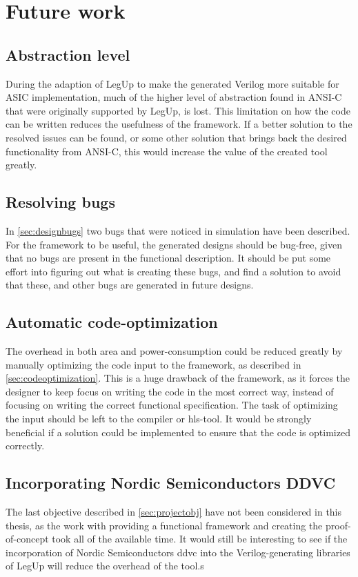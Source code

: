 \section{Future work}
\label{sec:futurework} 
\subsection{Abstraction level}
During the adaption of LegUp to make the generated Verilog more suitable for ASIC implementation, much of the higher level of abstraction found in ANSI-C that were originally supported by LegUp, is lost. This limitation on how the code can be written reduces the usefulness of the framework. If a better solution to the resolved issues can be found, or some other solution that brings back the desired functionality from ANSI-C, this would increase the value of the created tool greatly.

\subsection{Resolving bugs}
In \cref{sec:designbugs} two bugs that were noticed in simulation have been described. For the framework to be useful, the generated designs should be bug-free, given that no bugs are present in the functional description. It should be put some effort into figuring out what is creating these bugs, and find a solution to avoid that these, and other bugs are generated in future designs.

\subsection{Automatic code-optimization}
The overhead in both area and power-consumption could be reduced greatly by manually optimizing the code input to the framework, as described in \cref{sec:codeoptimization}. This is a huge drawback of the framework, as it forces the designer to keep focus on writing the code in the most correct way, instead of focusing on writing the correct functional specification. The task of optimizing the input should be left to the compiler or \gls{hls}-tool. It would be strongly beneficial if a solution could be implemented to ensure that the code is optimized correctly.

\subsection{Incorporating Nordic Semiconductors DDVC}
The last objective described in \cref{sec:projectobj} have not been considered in this thesis, as the work with providing a functional framework and creating the proof-of-concept took all of the available time. It would still be interesting to see if the incorporation of Nordic Semiconductors \gls{ddvc} into the Verilog-generating libraries of LegUp will reduce the overhead of the tool.s